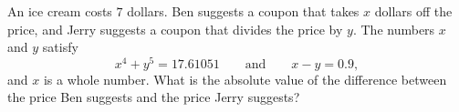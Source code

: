 An ice cream costs $7$ dollars. Ben suggests a coupon that takes $x$ dollars off the price, and Jerry suggests a coupon that divides the price by $y$. The numbers $x$ and $y$ satisfy
\[x^4+y^5=17.61051\qquad\text{and}\qquad x-y=0.9,\]
and $x$ is a whole number. What is the absolute value of the difference between the price Ben suggests and the price Jerry suggests?
